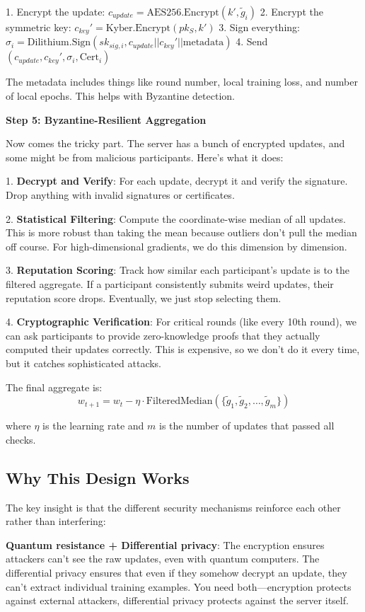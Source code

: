\documentclass[journal]{IEEEtran}
\begin{document}
1. Encrypt the update: $c_{update} = \text{AES256.Encrypt}(k', \tilde{g}_i)$
2. Encrypt the symmetric key: $c_{key}' = \text{Kyber.Encrypt}(pk_S, k')$
3. Sign everything: $\sigma_i = \text{Dilithium.Sign}(sk_{sig,i}, c_{update} || c_{key}' || \text{metadata})$
4. Send $(c_{update}, c_{key}', \sigma_i, \text{Cert}_i)$

The metadata includes things like round number, local training loss, and number of local epochs. This helps with Byzantine detection.

\textbf{Step 5: Byzantine-Resilient Aggregation}

Now comes the tricky part. The server has a bunch of encrypted updates, and some might be from malicious participants. Here's what it does:

1. \textbf{Decrypt and Verify}: For each update, decrypt it and verify the signature. Drop anything with invalid signatures or certificates.

2. \textbf{Statistical Filtering}: Compute the coordinate-wise median of all updates. This is more robust than taking the mean because outliers don't pull the median off course. For high-dimensional gradients, we do this dimension by dimension.

3. \textbf{Reputation Scoring}: Track how similar each participant's update is to the filtered aggregate. If a participant consistently submits weird updates, their reputation score drops. Eventually, we just stop selecting them.

4. \textbf{Cryptographic Verification}: For critical rounds (like every 10th round), we can ask participants to provide zero-knowledge proofs that they actually computed their updates correctly. This is expensive, so we don't do it every time, but it catches sophisticated attacks.

The final aggregate is:
$$w_{t+1} = w_t - \eta \cdot \text{FilteredMedian}(\{\tilde{g}_1, \tilde{g}_2, \ldots, \tilde{g}_m\})$$

where $\eta$ is the learning rate and $m$ is the number of updates that passed all checks.

\subsection{Why This Design Works}

The key insight is that the different security mechanisms reinforce each other rather than interfering:

\textbf{Quantum resistance + Differential privacy}: The encryption ensures attackers can't see the raw updates, even with quantum computers. The differential privacy ensures that even if they somehow decrypt an update, they can't extract individual training examples. You need both—encryption protects against external attackers, differential privacy protects against the server itself.
\end{document}
